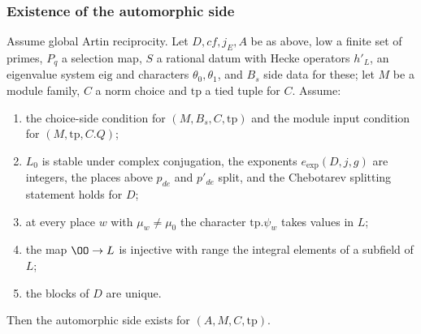 \subsubsection{Existence of the automorphic side}

\begin{proposition}\label{pf:baselat2:autside}
Assume global Artin reciprocity. Let $D,cf,j_E,A$ be as above, $\mathrm{low}$ a finite set of primes, $P_q$ a
selection map, $S$ a rational datum with Hecke operators $h'_L$, an eigenvalue system $\mathrm{eig}$ and
characters $\theta_0,\theta_1$, and $B_s$ side data for these; let $M$ be a module family, $C$ a norm choice and
$\mathrm{tp}$ a tied tuple for $C$. Assume:
\begin{enumerate}[label=(\alph*)]
\item the choice-side condition for $(M,B_s,C,\mathrm{tp})$ and the module input condition for $(M,\mathrm{tp},C.Q)$;
\item $L_0$ is stable under complex conjugation, the exponents $e_{\exp}(D,j,g)$ are integers, the places
  above $p_{de}$ and $p'_{de}$ split, and the Chebotarev splitting statement holds for $D$;
\item at every place $w$ with $\mu_w\neq\mu_0$ the character $\mathrm{tp}.\psi_w$ takes values in $L$;
\item the map $\OO\to L$ is injective with range the integral elements of a subfield of $L$;
\item the blocks of $D$ are unique.
\end{enumerate}
Then the automorphic side exists for $(A,M,C,\mathrm{tp})$.
\end{proposition}

